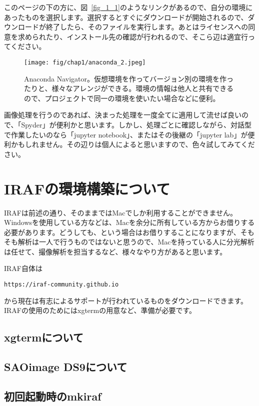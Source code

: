 このページの下の方に、図~\ref{fig_1_1}のようなリンクがあるので、自分の環境にあったものを選択します。選択するとすぐにダウンロードが開始されるので、ダウンロードが終了したら、そのファイルを実行します。あとはライセンスへの同意を求められたり、インストール先の確認が行われるので、そこら辺は適宜行ってください。
\begin{figure}
    \centering
    \texttt{[image: fig/chap1/anaconda\_2.jpeg]}
    \caption[Anaconda Navigator]{Anaconda Navigator。仮想環境を作ってバージョン別の環境を作ったりと、様々なアレンジができる。環境の情報は他人と共有できるので、プロジェクトで同一の環境を使いたい場合などに便利。 \label{fig_1_2}}
\end{figure}
    
画像処理を行うのであれば、決まった処理を一度全てに適用して流せば良いので、「Spyder」が便利かと思います。しかし、処理ごとに確認しながら、対話型で作業したいのなら「jupyter notebook」、またはその後継の「jupyter lab」が便利かもしれません。その辺りは個人によると思いますので、色々試してみてください。

\section{IRAFの環境構築について}
\label{sec_1_6}
IRAFは前述の通り、そのままではMacでしか利用することができません。Windowsを使用している方などは、Macを余分に所有している方からお借りする必要があります。どうしても、という場合はお借りすることになりますが、そもそも解析は一人で行うものではないと思うので、Macを持っている人に分光解析は任せて、撮像解析を担当するなど、様々なやり方があると思います。

IRAF自体は
\begin{verbatim}
https://iraf-community.github.io
\end{verbatim}
から現在は有志によるサポートが行われているものをダウンロードできます。IRAFの使用のためにはxgtermの用意など、準備が必要です。

\subsection{xgtermについて}
\label{subsec_1_6_1}

\subsection{SAOimage DS9について}
\label{subsec_1_6_2}

\subsection{初回起動時のmkiraf}
\label{subsec_1_6_3}